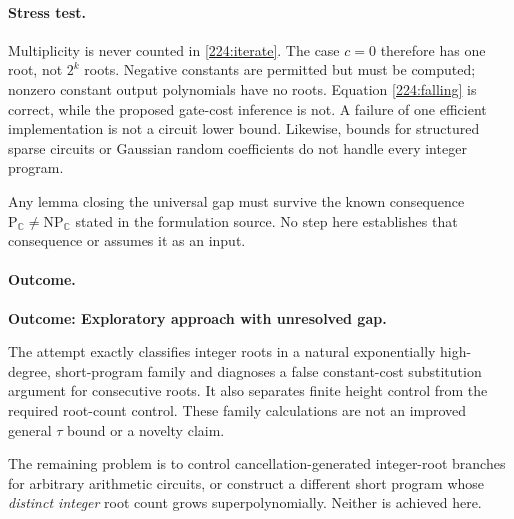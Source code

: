 \documentclass[11pt,a4paper]{article}
\newcommand{\C}{\mathbb{C}}
\numberwithin{equation}{section}
\begin{document}
\paragraph{Stress test.}
Multiplicity is never counted in \eqref{224:iterate}. The case $c=0$
therefore has one root, not $2^k$ roots. Negative constants are permitted
but must be computed; nonzero constant output polynomials have no roots.
Equation \eqref{224:falling} is correct, while the proposed gate-cost
inference is not. A failure of one efficient implementation is not a
circuit lower bound. Likewise, bounds for structured sparse circuits or
Gaussian random coefficients do not handle every integer program.

Any lemma closing the universal gap must survive the known consequence
$\mathrm P_{\C}\ne\mathrm{NP}_{\C}$ stated in the formulation source.
No step here establishes that consequence or assumes it as an input.

\paragraph{Outcome.}
\textbf{Outcome: Exploratory approach with unresolved gap.}

The attempt exactly classifies integer roots in a natural exponentially
high-degree, short-program family and diagnoses a false constant-cost
substitution argument for consecutive roots. It also separates finite
height control from the required root-count control. These family
calculations are not an improved general $\tau$ bound or a novelty claim.

The remaining problem is to control cancellation-generated integer-root
branches for arbitrary arithmetic circuits, or construct a different
short program whose \emph{distinct integer} root count grows
superpolynomially. Neither is achieved here.
\end{document}
